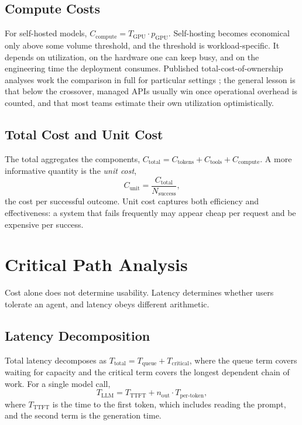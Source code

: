 \documentclass[11pt]{book}
\begin{document}
\subsection{Compute Costs}

For self-hosted models, $C_{\text{compute}} = T_{\text{GPU}} \cdot p_{\text{GPU}}$. Self-hosting becomes economical only above some volume threshold, and the threshold is workload-specific. It depends on utilization, on the hardware one can keep busy, and on the engineering time the deployment consumes. Published total-cost-of-ownership analyses work the comparison in full for particular settings \cite{tcoanalysis2024}; the general lesson is that below the crossover, managed APIs usually win once operational overhead is counted, and that most teams estimate their own utilization optimistically.

\subsection{Total Cost and Unit Cost}

The total aggregates the components, $C_{\text{total}} = C_{\text{tokens}} + C_{\text{tools}} + C_{\text{compute}}$. A more informative quantity is the \emph{unit cost},
\[
C_{\text{unit}} = \frac{C_{\text{total}}}{N_{\text{success}}},
\]
the cost per successful outcome. Unit cost captures both efficiency and effectiveness: a system that fails frequently may appear cheap per request and be expensive per success.

\section{Critical Path Analysis}

Cost alone does not determine usability. Latency determines whether users tolerate an agent, and latency obeys different arithmetic.

\subsection{Latency Decomposition}

Total latency decomposes as $T_{\text{total}} = T_{\text{queue}} + T_{\text{critical}}$, where the queue term covers waiting for capacity and the critical term covers the longest dependent chain of work. For a single model call,
\[
T_{\text{LLM}} = T_{\text{TTFT}} + n_{\text{out}} \cdot T_{\text{per-token}},
\]
where $T_{\text{TTFT}}$ is the time to the first token, which includes reading the prompt, and the second term is the generation time.
\end{document}
